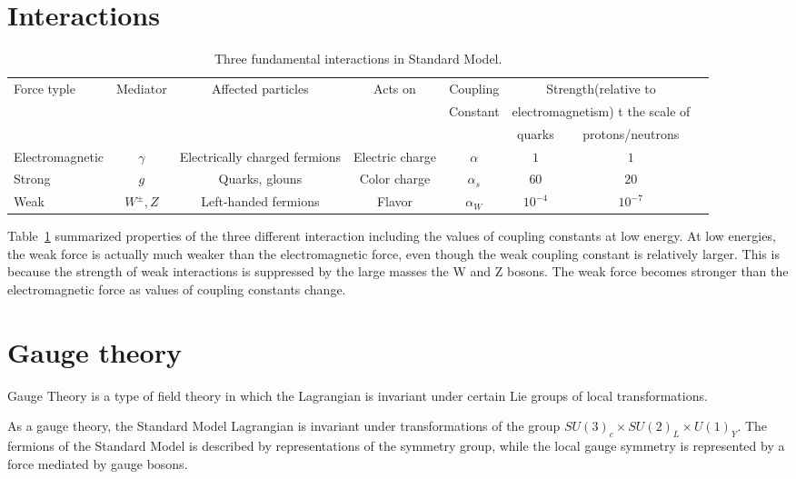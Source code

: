  

\section{Interactions}
\begin{table}[tbh]
\centering
\tiny
\begin{tabular}{|l|c|c|c|c|c|c|c}

\hline
    Force typle & Mediator & Affected particles & Acts on & Coupling&  \multicolumn{2}{c|}{Strength(relative to }\\
    &&&&Constant &\multicolumn{2}{c|}{electromagnetism) t the scale of}\\ 
    \hline
   &&&&&quarks& protons/neutrons \\
\hline
\hline
    Electromagnetic & $\gamma$&Electrically charged fermions&Electric charge& $\alpha$ &$1$&$1$\\
    Strong  & $g$ &Quarks, glouns & Color charge& $\alpha_s$ &$60$&$20$\\
    Weak & $W^{\pm}, Z$ &Left-handed fermions & Flavor& $\alpha_W$ &$10^{-4}$&$10^{-7}$\\
\hline

\end{tabular}
\caption{Three fundamental interactions in Standard Model. }
\label{tab:forces}
\end{table}

\par Table~\ref{tab:forces} summarized properties of the three different interaction including the values of coupling constants at low energy. 
At low energies, the weak force is actually much weaker than the electromagnetic force, even though the weak coupling constant is relatively larger. 
This is because the strength of weak interactions is suppressed by the large masses the W and Z bosons. The weak force becomes stronger than the electromagnetic force as values of coupling constants change.

\section{Gauge theory}
\par Gauge Theory is a type of field theory in which the Lagrangian is invariant under certain Lie groups of local transformations.
\par As a gauge theory, the Standard Model Lagrangian is invariant under transformations of the group $SU(3)_c \times SU(2)_L \times U(1)_Y$. The fermions of the Standard Model is described by representations of the symmetry group, while the local gauge symmetry is represented by a force mediated by gauge bosons.

